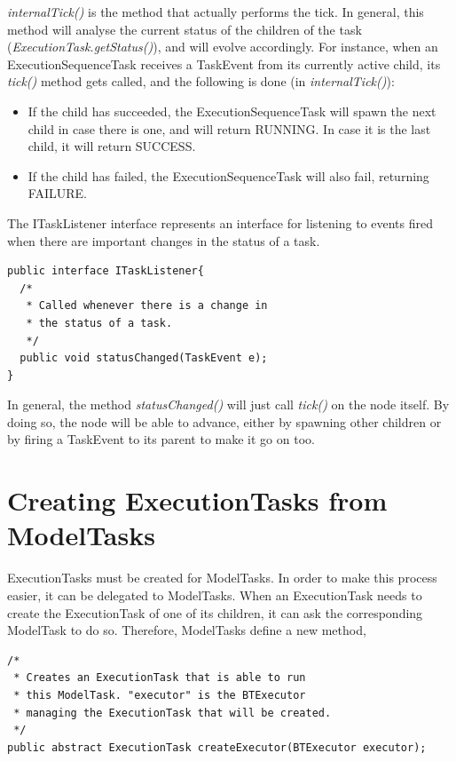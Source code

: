 \documentclass[a4paper,10pt]{article}
\begin{document}
\textit{internalTick()} is the method that actually performs the tick. In general, this method will analyse the current status of the children of the task (\textit{ExecutionTask.getStatus()}), and will evolve accordingly. For instance, when an ExecutionSequenceTask receives a TaskEvent from its currently active child, its \textit{tick()} method gets called, and the following is done (in \textit{internalTick()}):

\begin{itemize}
\item If the child has succeeded, the ExecutionSequenceTask will spawn the next child in case there is one, and will return RUNNING. In case it is the last child, it will return SUCCESS.
\item If the child has failed, the ExecutionSequenceTask will also fail, returning FAILURE.
\end{itemize}

The ITaskListener interface represents an interface for listening to events fired when there are important changes in the status of a task.

\begin{verbatim}
public interface ITaskListener{
  /* 
   * Called whenever there is a change in
   * the status of a task. 
   */
  public void statusChanged(TaskEvent e);
}
\end{verbatim}

In general, the method \textit{statusChanged()} will just call \textit{tick()} on the node itself. By doing so, the node will be able to advance, either by spawning other children or by firing a TaskEvent to its parent to make it go on too.


\section{Creating ExecutionTasks from ModelTasks}

ExecutionTasks must be created for ModelTasks. In order to make this process easier, it can be delegated to ModelTasks. When an ExecutionTask needs to create the ExecutionTask of one of its children, it can ask the corresponding ModelTask to do so. Therefore, ModelTasks define a new method,

\begin{verbatim}
/* 
 * Creates an ExecutionTask that is able to run 
 * this ModelTask. "executor" is the BTExecutor 
 * managing the ExecutionTask that will be created.
 */
public abstract ExecutionTask createExecutor(BTExecutor executor);
\end{verbatim}
\end{document}
